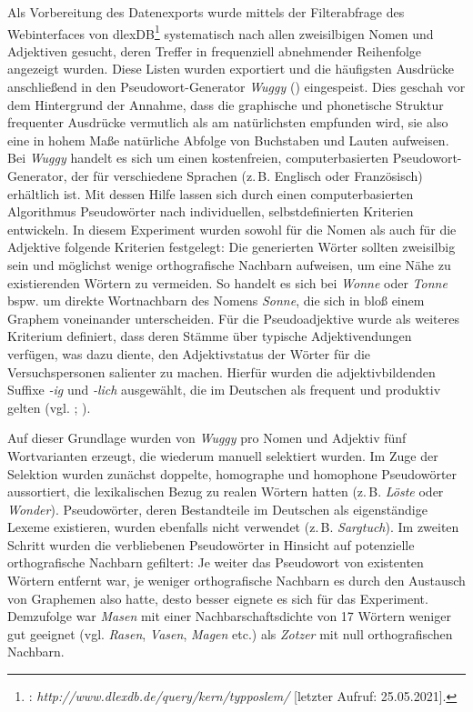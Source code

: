 Als Vorbereitung des Datenexports wurde mittels der Filterabfrage des Webinterfaces von dlexDB\footnote{\citet[]{dlex.2011}: \textit{http://www.dlexdb.de/query/kern/typposlem/} [letzter Aufruf: 25.05.2021].} systematisch nach allen zweisilbigen Nomen und Adjektiven gesucht, deren Treffer in frequenziell abnehmender Reihenfolge angezeigt wurden. Diese Listen wurden exportiert und die häufigsten Ausdrücke anschließend in den Pseudowort-Generator \textit{Wuggy} (\citealt[]{Keuleers.2010}) eingespeist. Dies geschah vor dem Hintergrund der Annahme, dass die graphische und phonetische Struktur frequenter Ausdrücke vermutlich als am natürlichsten empfunden wird, sie also eine in hohem Maße natürliche Abfolge von Buchstaben und Lauten aufweisen. Bei {\textit{Wuggy}} handelt es sich um einen kostenfreien, computerbasierten Pseudowort-Generator, der für verschiedene Sprachen (z.\,B. Englisch oder Französisch) erhältlich ist. Mit dessen Hilfe lassen sich durch einen computerbasierten Algorithmus Pseudowörter nach individuellen, selbstdefinierten Kriterien entwickeln. In diesem Experiment wurden sowohl für die Nomen als auch für die Adjektive folgende Kriterien festgelegt: Die generierten Wörter sollten zweisilbig sein und möglichst wenige orthografische Nachbarn aufweisen, um eine Nähe zu existierenden Wörtern zu vermeiden. So handelt es sich bei \textit{Wonne} oder \textit{Tonne} bspw. um direkte Wortnachbarn des Nomens \textit{Sonne}, die sich in bloß einem Graphem voneinander unterscheiden. Für die Pseudoadjektive wurde als weiteres Kriterium definiert, dass deren Stämme über typische Adjektivendungen verfügen, was dazu diente, den Adjektivstatus der Wörter für die Versuchspersonen salienter zu machen. Hierfür wurden die adjektivbildenden Suffixe \textit{-ig} und \textit{-lich} ausgewählt, die im Deutschen als frequent und produktiv gelten (vgl. {\citealt[530]{Wellmann.1998}}; {\citealt[298]{Fleischer.2012}}).


Auf dieser Grundlage wurden von \textit{Wuggy} pro Nomen und Adjektiv fünf Wortvarianten erzeugt, die wiederum manuell selektiert wurden. Im Zuge der Selektion wurden zunächst doppelte, homographe und homophone Pseudowörter aussortiert, die lexikalischen Bezug zu realen Wörtern hatten (z.\,B. \textit{Löste} oder \textit{Wonder}). Pseudowörter, deren Bestandteile im Deutschen als eigenständige Lexeme existieren, wurden ebenfalls nicht verwendet (z.\,B. \textit{Sargtuch}). Im zweiten Schritt wurden die verbliebenen Pseudowörter in Hinsicht auf potenzielle orthografische Nachbarn gefiltert: Je weiter das Pseudowort von existenten Wörtern entfernt war, je weniger orthografische Nachbarn es durch den Austausch von Graphemen also hatte, desto besser eignete es sich für das Experiment. Demzufolge war \textit{Masen} mit einer Nachbarschaftsdichte von 17 Wörtern weniger gut geeignet (vgl. \textit{Rasen}, \textit{Vasen}, {\textit{Magen} etc.}) als \textit{Zotzer} mit null orthografischen Nachbarn.


